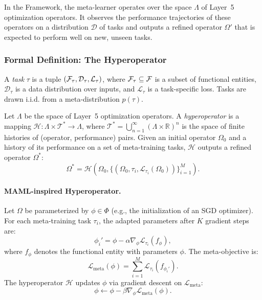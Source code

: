 In the \Apeiron{} Framework, the meta-learner operates over the space $\Lambda$ of Layer~5 optimization operators. It observes the performance trajectories of these operators on a distribution $\mathcal{D}$ of tasks and outputs a refined operator $\Omega'$ that is expected to perform well on new, unseen tasks.

\subsubsection{Formal Definition: The Hyperoperator}
\begin{definition}
A \emph{task} $\tau$ is a tuple $(\mathcal{F}_\tau, \mathcal{D}_\tau, \mathcal{L}_\tau)$, where $\mathcal{F}_\tau \subseteq \mathcal{F}$ is a subset of functional entities, $\mathcal{D}_\tau$ is a data distribution over inputs, and $\mathcal{L}_\tau$ is a task-specific loss. Tasks are drawn i.i.d. from a meta-distribution $p(\tau)$.
\end{definition}

\begin{definition}[Hyperoperator]
Let $\Lambda$ be the space of Layer~5 optimization operators. A \emph{hyperoperator} is a mapping $\mathcal{H}: \Lambda \times \mathcal{T}^* \to \Lambda$, where $\mathcal{T}^* = \bigcup_{n=1}^\infty (\Lambda \times \mathbb{R})^n$ is the space of finite histories of (operator, performance) pairs. Given an initial operator $\Omega_0$ and a history of its performance on a set of meta-training tasks, $\mathcal{H}$ outputs a refined operator $\Omega^*$:
\[
\Omega^* = \mathcal{H}(\Omega_0, \{(\Omega_0, \tau_i, \mathcal{L}_{\tau_i}(\Omega_0))\}_{i=1}^M).
\]
\end{definition}

\paragraph{MAML-inspired Hyperoperator.}
Let $\Omega$ be parameterized by $\phi \in \Phi$ (e.g., the initialization of an SGD optimizer). For each meta-training task $\tau_i$, the adapted parameters after $K$ gradient steps are:
\[
\phi_i' = \phi - \alpha \nabla_\phi \mathcal{L}_{\tau_i}(f_{\phi}),
\]
where $f_\phi$ denotes the functional entity with parameters $\phi$. The meta-objective is:
\[
\mathcal{L}_{\text{meta}}(\phi) = \sum_{i=1}^M \mathcal{L}_{\tau_i}(f_{\phi_i'}).
\]
The hyperoperator $\mathcal{H}$ updates $\phi$ via gradient descent on $\mathcal{L}_{\text{meta}}$:
\[
\phi \leftarrow \phi - \beta \nabla_\phi \mathcal{L}_{\text{meta}}(\phi).
\]

